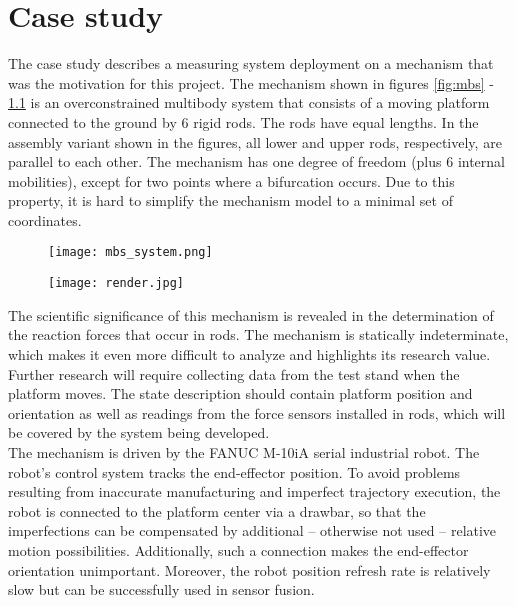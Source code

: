 \chapter{Case study}

The case study describes a measuring system deployment on a mechanism that was the motivation for this project. The mechanism shown in figures \ref{fig:mbs} - \ref{fig:render} is an overconstrained multibody system \cite{bib:BPAS2012} that consists of a moving platform connected to the ground by 6 rigid rods. The rods have equal lengths. In the assembly variant shown in the figures, all lower and upper rods, respectively, are parallel to each other. The mechanism has one degree of freedom (plus 6 internal mobilities), except for two points where a bifurcation occurs. Due to this property, it is hard to simplify the mechanism model to a minimal set of coordinates.

\begin{figure}[!h]
	\centering
	\begin{minipage}{.5\textwidth}
		\centering
		\texttt{[image: mbs\_system.png]}
		\label{fig:mbs}
	\end{minipage}%
	\begin{minipage}{.5\textwidth}
		\centering
		\texttt{[image: render.jpg]}
		\label{fig:render}
	\end{minipage}
\end{figure}

The scientific significance of this mechanism is revealed in the determination of the reaction forces that occur in rods. The mechanism is statically indeterminate, which makes it even more difficult to analyze and highlights its research value. Further research will require collecting data from the test stand when the platform moves. The state description should contain platform position and orientation as well as readings from the force sensors installed in rods, which will be covered by the system being developed.\\

The mechanism is driven by the FANUC M-10iA serial industrial robot. The robot’s control system tracks the end-effector position. To avoid problems resulting from inaccurate manufacturing and imperfect trajectory execution, the robot is connected to the platform center via a drawbar, so that the imperfections can be compensated by additional -- otherwise not used -- relative motion possibilities. Additionally, such a connection makes the end-effector orientation unimportant. Moreover, the robot position refresh rate is relatively slow but can be successfully used in sensor fusion.\\

